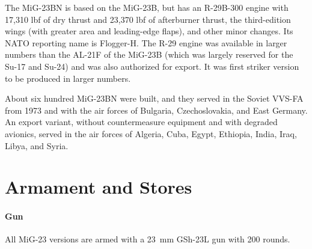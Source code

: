 The MiG-23BN is based on the MiG-23B, but has an R-29B-300  engine with 17,310 lbf of dry thrust and 23,370 lbf of afterburner thrust, the third-edition wings (with greater area and leading-edge flaps), and other minor changes.
Its NATO reporting name is Flogger-H.
The R-29 engine was available in larger numbers than the AL-21F of the MiG-23B (which was largely reserved for the Su-17 and Su-24) and was also authorized for export. It was first striker version to be produced in larger numbers.%

About six hundred MiG-23BN were built, and they served in the Soviet VVS-FA from 1973 and with the air forces of Bulgaria, Czechoslovakia, and East Germany.
An export variant, without countermeasure equipment and with degraded avionics, served in the air forces of Algeria, Cuba, Egypt, Ethiopia, India, Iraq, Libya, and Syria.%

\section{Armament and Stores}

\paragraph{Gun}
All MiG-23 versions are armed with a 23~mm GSh-23L gun with 200 rounds.%

